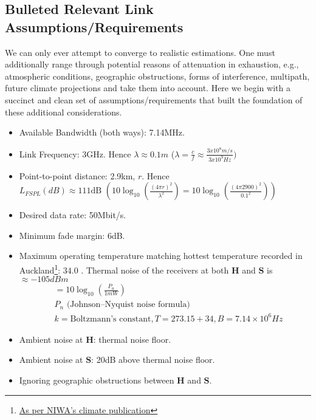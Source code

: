 \documentclass{article}
\begin{document}
\newpage

\subsection*{Bulleted Relevant Link Assumptions/Requirements}
We can only ever attempt to converge to realistic estimations. One must additionally range through potential reasons of attenuation in exhaustion, e.g., atmospheric conditions, geographic obstructions, forms of interference, multipath, future climate projections and take them into account. Here we begin with a succinct and clean set of assumptions/requirements that built the foundation of these additional considerations.

\begin{itemize}
				\item Available Bandwidth (both ways): 7.14MHz.
				\item Link Frequency: 3GHz.
								\subitem Hence $\lambda \approx 0.1m$ ($\lambda = \frac{c}{f} \approx \frac{3x10^8 m/s}{3x10^9Hz})$
				\item Point-to-point distance: 2.9km, $r$.
								\subitem Hence $L_{FSPL}(dB) \approx 111\text{dB }(10 \log_{10} (\frac{(4 \pi r)^2}{\lambda^2}) = 10 \log_{10} (\frac{(4\pi 2900)^2}{0.1^2}))$
				\item Desired data rate: 50Mbit/s.
				\item Minimum fade margin: 6dB.
				\item Maximum operating temperature matching hottest temperature recorded in Auckland\footnote{\href{https://niwa.co.nz/static/Auckland\%20ClimateWEB.pdf}{As per NIWA's climate publication}}: $34.0$ \textcelsius{}.
								\subitem Thermal noise of the receivers at both $\boldsymbol{H}$ and $\boldsymbol{S}$ is $\approx -105dBm$
								\begin{align*}
												&= 10 \log_{10} (\frac{P_n}{1mW}) \\
												&P_n\text{ (Johnson–Nyquist noise formula)} \\
												&k = \text{Boltzmann's constant}, T = 273.15 + 34, B = 7.14 \times 10^6Hz
								\end{align*}

				\item Ambient noise at $\boldsymbol{H}$: thermal noise floor.
				\item Ambient noise at $\boldsymbol{S}$: 20dB above thermal noise floor.
				\item Ignoring geographic obstructions between $\boldsymbol{H}$ and $\boldsymbol{S}$.
\end{itemize}
\end{document}
